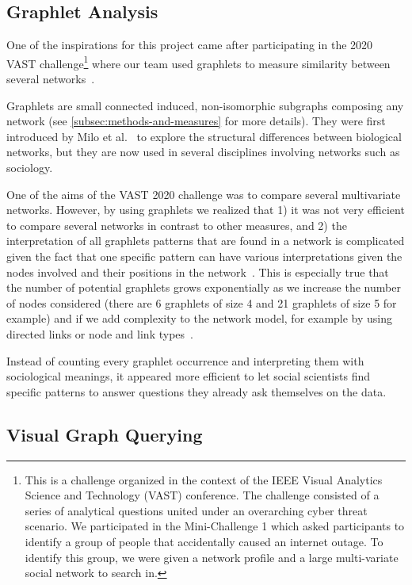 \subsection{Graphlet Analysis}

One of the inspirations for this project came after participating in the 2020 VAST challenge\footnote{This is a challenge organized in the context of the IEEE Visual Analytics Science and Technology (VAST) conference. The challenge consisted of a series of analytical questions united under an overarching cyber threat scenario. We participated in the Mini-Challenge 1 which asked participants to identify a group of people that accidentally caused an internet outage. To identify this group, we were given a network profile and a large multi-variate social network to search in.} where our team used graphlets to measure similarity between several networks~\cite{tovanichVAST2020Contest2021}.

Graphlets are small connected induced, non-isomorphic subgraphs composing any network (see \autoref{subsec:methods-and-measures} for more details).
They were first introduced by Milo et al.~\cite{miloNetworkMotifsSimple2002} to explore the structural differences between biological networks, but they are now used in several disciplines involving networks such as sociology\cite{charbeyStarsHolesPaths2019}.

One of the aims of the VAST 2020 challenge was to compare several multivariate networks.
However, by using graphlets we realized that 1) it was not very efficient to compare several networks in contrast to other measures, and 2) the interpretation of all graphlets patterns that are found in a network is complicated given the fact that one specific pattern can have various interpretations given the nodes involved and their positions in the network~\cite{ingramNetworkMotifsStructure2006}.
This is especially true that the number of potential graphlets grows exponentially as we increase the number of nodes considered (there are 6 graphlets of size 4 and 21 graphlets of size 5 for example) and if we add complexity to the network model, for example by using directed links or node and link types~\cite{ribeiroDiscoveringColoredNetwork2014}.

Instead of counting every graphlet occurrence and interpreting them with sociological meanings, it appeared more efficient to let social scientists find specific patterns to answer questions they already ask themselves on the data.


\subsection{Visual Graph Querying}


